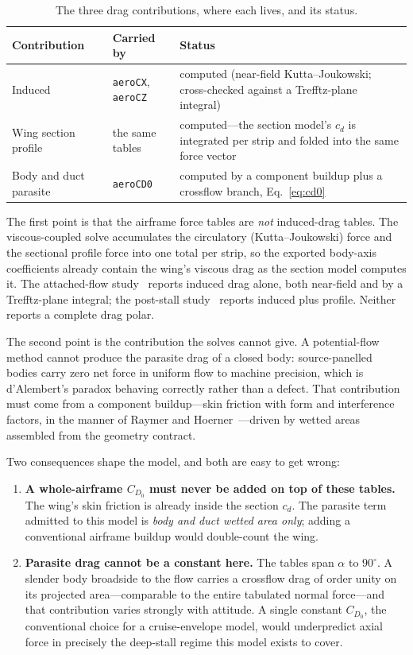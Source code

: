 \documentclass[11pt,a4paper]{article}
\newcommand{\varid}[1]{\texttt{\small #1}}
\newcommand{\dg}{^\circ}
\begin{document}
\begin{table}[htbp]
\centering
\caption{The three drag contributions, where each lives, and its status.}
\label{tab:drag}
\begin{tabular}{@{}llp{52mm}@{}}
\toprule
\textbf{Contribution} & \textbf{Carried by} & \textbf{Status} \\
\midrule
Induced & \varid{aeroCX}, \varid{aeroCZ} & computed (near-field
Kutta--Joukowski; cross-checked against a Trefftz-plane integral) \\
Wing section profile & the same tables & computed---the section model's
$c_d$ is integrated per strip and folded into the same force vector \\
Body and duct parasite & \varid{aeroCD0} & computed by a component
buildup plus a crossflow branch, Eq.~\eqref{eq:cd0} \\
\bottomrule
\end{tabular}
\end{table}

The first point is that the airframe force tables are \emph{not} induced-drag
tables. The viscous-coupled solve accumulates the circulatory
(Kutta--Joukowski) force and the sectional profile force into one total
per strip, so the exported body-axis coefficients already contain the
wing's viscous drag as the section model computes it. The attached-flow
study~\cite{partone} reports induced drag alone, both near-field and by a
Trefftz-plane integral; the post-stall study~\cite{parttwo} reports
induced plus profile. Neither reports a complete drag polar.

The second point is the contribution the solves cannot give. A
potential-flow method cannot produce the parasite drag of a closed body:
source-panelled bodies carry zero net force in uniform flow to machine
precision, which is d'Alembert's paradox behaving correctly rather than a
defect. That contribution must come from a component buildup---skin
friction with form and interference factors, in the manner of Raymer and
Hoerner~\cite{raymer2018,hoerner1965fluiddynamicdrag}---driven by wetted
areas assembled from the geometry contract.

Two consequences shape the model, and both are easy to get wrong:

\begin{enumerate}
\item \textbf{A whole-airframe $C_{D_0}$ must never be added on top of
these tables.} The wing's skin friction is already inside the section
$c_d$. The parasite term admitted to this model is \emph{body and duct
wetted area only}; adding a conventional airframe buildup would
double-count the wing.
\item \textbf{Parasite drag cannot be a constant here.} The tables span
$\alpha$ to $90\dg$. A slender body broadside to the flow carries a
crossflow drag of order unity on its projected area---comparable to the
entire tabulated normal force---and that contribution varies strongly
with attitude. A single constant $C_{D_0}$, the conventional choice for a
cruise-envelope model, would underpredict axial force in precisely the
deep-stall regime this model exists to cover.
\end{enumerate}
\end{document}
